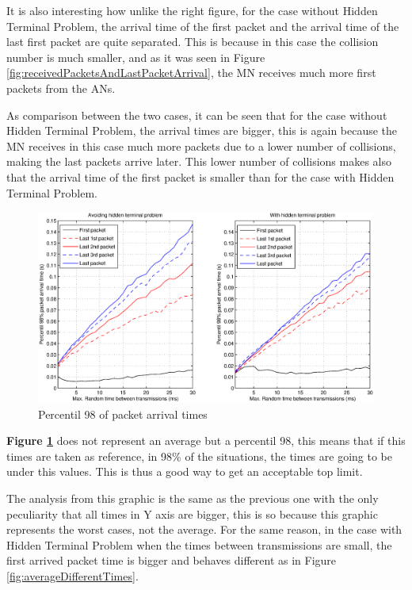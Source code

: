 It is also interesting how unlike the right figure, for the case without Hidden Terminal Problem, the arrival time of the first packet and the arrival 
time of the last first packet are quite separated. This is because in this case the collision number is much smaller, and as it was seen in Figure 
\ref{fig:receivedPacketsAndLastPacketArrival}, the \ac{MN} receives much more first packets from the \acp{AN}.

As comparison between the two cases, it can be seen that for the case without Hidden Terminal Problem, the arrival times are bigger, this is again because
the \ac{MN} receives in this case much more packets due to a lower number of collisions, making the last packets arrive later. This lower number of 
collisions makes also that the arrival time of the first packet is smaller than for the case with Hidden Terminal Problem.

\begin{figure}[ht]
 \begin{center}
  \includegraphics[width=1\textwidth]{percentil98differentTimes.eps}
 \end{center}
 \caption{Percentil 98 of packet arrival times}
 \label{fig:percentil98differentTimes}
\end{figure}

\textbf{Figure \ref{fig:percentil98differentTimes}} does not represent an average but a percentil 98, this means that if this times are taken as 
reference, in 98\% of the situations, the times are going to be under this values. This is thus a good way to get an acceptable top limit.

The analysis from this graphic is the same as the previous one with the only peculiarity that all times in Y axis are bigger, this is so because
this graphic represents the worst cases, not the average. For the same reason, in the case with Hidden Terminal Problem when the times between
transmissions are small, the first arrived packet time is bigger and behaves different as in Figure \ref{fig:averageDifferentTimes}.

